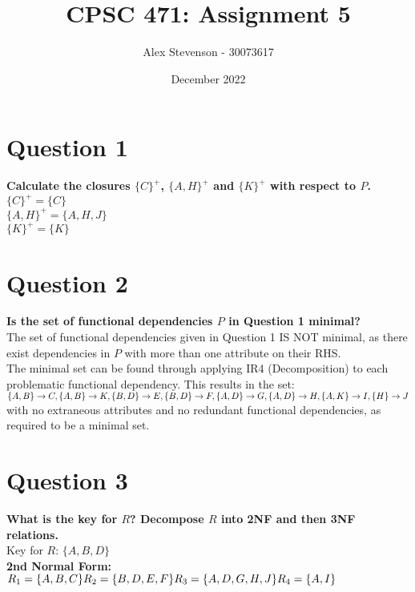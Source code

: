 \documentclass{article}
\title{CPSC 471: Assignment 5}
\author{Alex Stevenson - 30073617}
\date{December 2022}
\begin{document}
\maketitle

\section*{Question 1}
\textbf{Calculate the closures $\{C\}^+$, $\{A, H\}^+$ and $\{K\}^+$ with respect to $P$.} \\
$\{C\}^+ = \{C\}$ \\
$\{A, H\}^+ = \{A, H, J\}$ \\
$\{K\}^+ = \{K\}$

\section*{Question 2}
\textbf{Is the set of functional dependencies $P$ in Question 1 minimal?} \\
The set of functional dependencies given in Question 1 IS NOT minimal, as there exist dependencies in $P$ with more than one attribute on their RHS. \\

The minimal set can be found through applying IR4 (Decomposition) to each problematic functional dependency. This results in the set: \\
$
\{A,B\} \rightarrow C, \\
\{A,B\} \rightarrow K, \\
\{B,D\} \rightarrow E, \\
\{B,D\} \rightarrow F, \\
\{A,D\} \rightarrow G, \\
\{A,D\} \rightarrow H, \\
\{A,K\} \rightarrow I, \\
\{H\} \rightarrow J \\
$
with no extraneous attributes and no redundant functional dependencies, as required to be a minimal set.

\section*{Question 3}
\textbf{What is the key for $R$? Decompose $R$ into 2NF and then 3NF relations.} \\
Key for $R$: $\{A, B, D\}$ \\

\textbf{2nd Normal Form:} \\
$R_1 = \{A, B, C\} \\
R_2 = \{B, D, E, F\} \\
R_3 = \{A, D, G, H, J\} \\
R_4 = \{A, I\} \\
$
\end{document}
